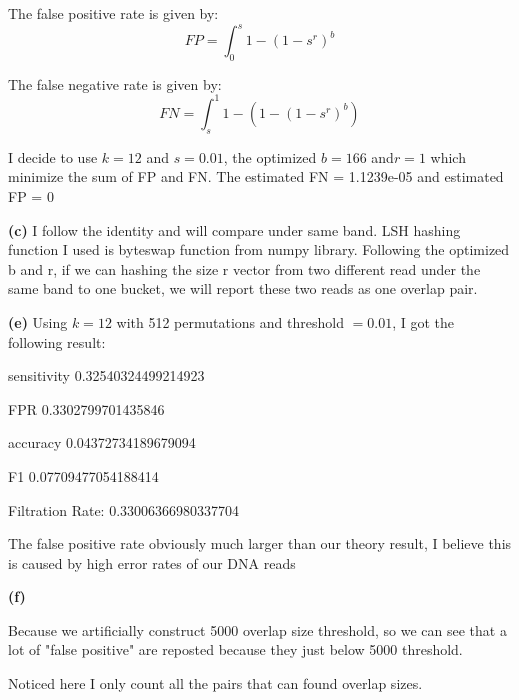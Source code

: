 \documentclass[11pt]{article}
\renewcommand\part[1]{\vspace{.10in}\textbf{(#1)}}
\begin{document}
The false positive rate is given by:
\[ FP = \int_{0}^{s}1 - (1-s^{r})^{b} \]

The false negative rate is given by:
\[ FN = \int_{s}^{1}1- (1 - (1-s^{r})^{b}) \]

I decide to use $ k = 12 $ and $ s = 0.01 $, the optimized $ b = 166 $ and$  r = 1 $ which  minimize the sum of FP and FN. The estimated FN = 1.1239e-05 and estimated FP = 0

\part{c}
I follow the identity and will compare under same band.
LSH hashing function I used is byteswap function from numpy library. Following the optimized b and r, if we can hashing the size r vector from two different read under the same band to one bucket, we will report these two reads as one overlap pair.

\part{e}
Using $ k = 12 $ with 512 permutations and threshold $ = 0.01 $, I got the following result:

sensitivity 0.32540324499214923


FPR 0.3302799701435846


accuracy 0.04372734189679094


F1 0.07709477054188414


Filtration Rate: 0.33006366980337704

The false positive rate obviously much larger than our theory result, I believe this is caused by high error rates of our DNA reads

\part{f}

Because we artificially construct 5000 overlap size threshold, so we can see that a lot of "false positive" are reposted because they just below 5000 threshold.

Noticed here I only count all the pairs that can found overlap sizes.
\end{document}
